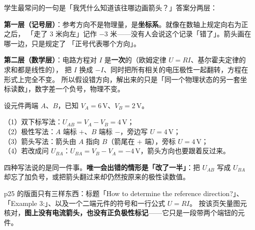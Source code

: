 \documentclass[11pt]{ctexart}
\begin{document}

学生最常问的一句是「我凭什么知道该往哪边画箭头？」答案分两层：

\textbf{第一层（记号层）}：参考方向不是物理量，是\textbf{坐标系}。就像在数轴上规定向右为正之后，
「走了 3 米向左」记作 $-3$ 米——没有人会说这个记录「错了」。箭头画在哪一边，只是规定了
「正号代表哪个方向」。

\textbf{第二层（数学层）}：电路方程对 $I$ 是\textbf{一次}的（欧姆定律 $U=RI$、基尔霍夫定律的求和都是线性的），
把 $I$ 换成 $-I$、同时把所有相关的电压极性一起翻转，方程在形式上完全不变。
所以假设错方向，解出来的只是「同一个物理状态的另一套坐标读数」，数字差一个负号，物理不变。



设元件两端 $A$、$B$，已知 $V_A = 6\,\mathrm{V}$、$V_B = 2\,\mathrm{V}$。

\par\vspace{1pt}
\noindent
（1）双下标写法：$U_{AB} = V_A - V_B = 4\,\mathrm{V}$；\\
（2）极性写法：$A$ 端标 $+$、$B$ 端标 $-$，旁边写 $U = 4\,\mathrm{V}$；\\
（3）箭头写法：箭头由 $A$ 指向 $B$（箭尾在 $+$ 端），旁标 $U = 4\,\mathrm{V}$；\\
（4）若改成问 $U_{BA}$：$U_{BA} = V_B - V_A = -4\,\mathrm{V}$，箭头方向也要跟着反过来。
\par\vspace{2pt}

四种写法说的是同一件事。\textbf{唯一会出错的情形是「改了一半」}：把 $U_{AB}$ 写成 $U_{BA}$
却忘了加负号，或把箭头翻过来却仍然按原来的极性读数值。



p25 的版面只有三样东西：标题「How to determine the reference direction?」、
「Example 3:」、以及一个二端元件的符号和一行公式 $U=RI$。
按该页矢量图元核对，\textbf{图上没有电流箭头，也没有正负极性标记}——它只是一段带两个端钮的元件。
\end{document}
